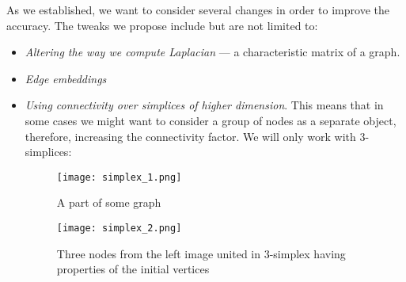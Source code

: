     As we established, we want to consider several changes in order to improve the accuracy.
    The tweaks we propose include but are not limited to:
    \begin{itemize}
        \item \textit{Altering the way we compute Laplacian} --- a characteristic matrix of a graph.
        \item \textit{Edge embeddings}
        \item \textit{Using connectivity over simplices of higher dimension}. This means that in some cases we might want to consider a group of nodes as a separate object, therefore, increasing the connectivity factor. We will only work with 3-simplices:
            \begin{figure}[h]
                \begin{multicols}{2}
                    \centering
                    \texttt{[image: simplex\_1.png]}
                    \caption{A part of some graph}\label{fig:clique_merged}
        
                    \centering
                    \texttt{[image: simplex\_2.png]}
                    \caption{Three nodes from the left image united in 3-simplex having properties of the initial vertices}
                \end{multicols}
            \end{figure}
    \end{itemize}

